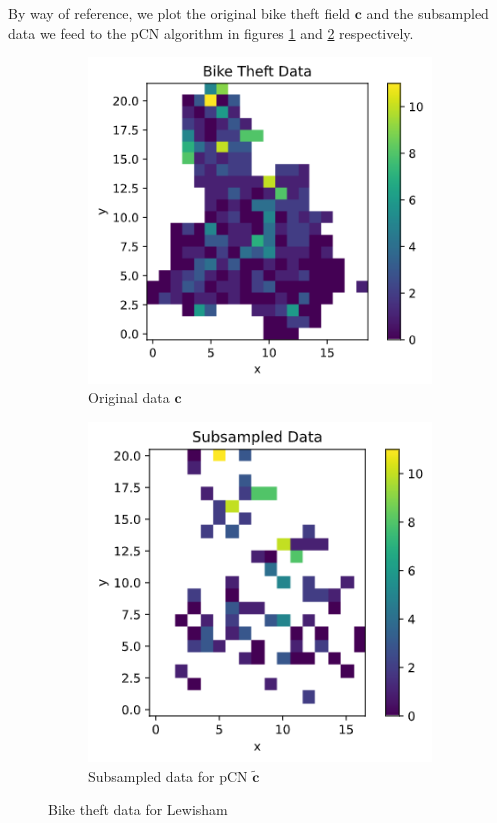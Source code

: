 \documentclass[]{article}
\newcommand{\cbold}{\boldsymbol{c}}
\begin{document}
By way of reference, we plot the original bike theft field $\cbold$ and the subsampled data we feed to the pCN algorithm in figures \ref{fig:c-original} and \ref{fig:c-tilde} respectively.
%
\begin{figure}[!h]
	\centering
	\begin{subfigure}{0.32\linewidth}
		\includegraphics[width=\linewidth]{c-original.png}
		\caption{Original data $\cbold$}
		\label{fig:c-original}
	\end{subfigure}
	\begin{subfigure}{0.31\linewidth}
		\includegraphics[width=\linewidth]{c-tilde.png}
		\caption{Subsampled data for pCN $\tilde{\cbold}$}
		\label{fig:c-tilde}
	\end{subfigure}
	\caption{Bike theft data for Lewisham}
	\label{fig:bike-theft-data}
\end{figure}
\end{document}
